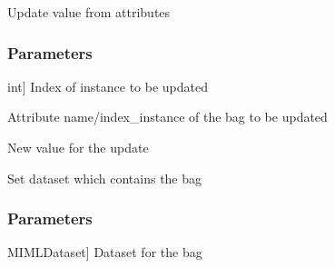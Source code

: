 \documentclass[letterpaper,10pt,english]{sphinxmanual}
\begin{document}
\begin{fulllineitems}

\begin{fulllineitems}
\label{\detokenize{data/_autosummary/miml.data.bag.Bag:miml.data.bag.Bag.set_attribute}}
\pysigstartsignatures
{}
\pysigstopsignatures
\sphinxAtStartPar
Update value from attributes


\subsubsection{Parameters}
\label{\detokenize{data/_autosummary/miml.data.bag.Bag:id17}}\begin{description}
\sphinxlineitem{instance}{[}int{]}
\sphinxAtStartPar
Index of instance to be updated

\sphinxAtStartPar
Attribute name/index\_instance of the bag to be updated

\sphinxAtStartPar
New value for the update

\end{description}

\end{fulllineitems}


\begin{fulllineitems}
\label{\detokenize{data/_autosummary/miml.data.bag.Bag:miml.data.bag.Bag.set_dataset}}
\pysigstartsignatures
{}
\pysigstopsignatures
\sphinxAtStartPar
Set dataset which contains the bag


\subsubsection{Parameters}
\label{\detokenize{data/_autosummary/miml.data.bag.Bag:id18}}\begin{description}
\sphinxlineitem{dataset}{[}MIMLDataset{]}
\sphinxAtStartPar
Dataset for the bag


\end{description}
\end{fulllineitems}
\end{fulllineitems}
\end{document}

